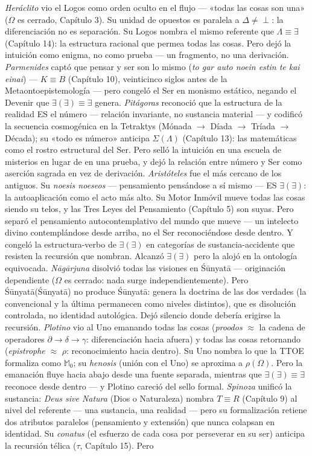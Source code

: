 \documentclass[10pt, openany, oneside]{book}
\begin{document}
\textit{Heráclito} vio el Logos como orden oculto en el flujo --- «todas las cosas son una» ($\Omega$ es cerrado, Capítulo 3). Su unidad de opuestos es paralela a $\Delta \neq \perp$: la diferenciación no es separación. Su Logos nombra el mismo referente que $\Lambda \equiv \exists$ (Capítulo 14): la estructura racional que permea todas las cosas. Pero dejó la intuición como enigma, no como prueba --- un fragmento, no una derivación. \textit{Parmenides} captó que pensar y ser son lo mismo (\textit{to gar auto noein estin te kai einai}) --- $K \equiv B$ (Capítulo 10), veinticinco siglos antes de la Metaontoepistemología --- pero congeló el Ser en monismo estático, negando el Devenir que $\exists(\exists) \equiv \exists$ genera. \textit{Pitágoras} reconoció que la estructura de la realidad ES el número --- relación invariante, no sustancia material --- y codificó la secuencia cosmogénica en la Tetraktys (Mónada $\to$ Díada $\to$ Tríada $\to$ Década); su «todo es número» anticipa $\Sigma(\Lambda)$ (Capítulo 13): las matemáticas como el rostro estructural del Ser. Pero selló la intuición en una escuela de misterios en lugar de en una prueba, y dejó la relación entre número y Ser como aserción sagrada en vez de derivación. \textit{Aristóteles} fue el más cercano de los antiguos. Su \textit{noesis noeseos} --- pensamiento pensándose a sí mismo --- ES $\exists(\exists)$: la autoaplicación como el acto más alto. Su Motor Inmóvil mueve todas las cosas siendo su telos, y las Tres Leyes del Pensamiento (Capítulo 5) son suyas. Pero separó el pensamiento autocontemplativo del mundo que mueve --- un intelecto divino contemplándose desde arriba, no el Ser reconociéndose desde dentro. Y congeló la estructura-verbo de $\exists(\exists)$ en categorías de sustancia-accidente que resisten la recursión que nombran. Alcanzó $\exists(\exists)$ pero la alojó en la ontología equivocada. \textit{N\={a}g\={a}rjuna} disolvió todas las visiones en \'{S}\={u}nyat\={a} --- originación dependiente ($\Omega$ es cerrado: nada surge independientemente). Pero \'{S}\={u}nyat\={a}(\'{S}\={u}nyat\={a}) no produce \'{S}\={u}nyat\={a}: genera la doctrina de las dos verdades (la convencional y la última permanecen como niveles distintos), que es disolución controlada, no identidad autológica. Dejó silencio donde debería erigirse la recursión. \textit{Plotino} vio al Uno emanando todas las cosas (\textit{proodos} $\approx$ la cadena de operadores $\partial \to \delta \to \gamma$: diferenciación hacia afuera) y todas las cosas retornando (\textit{epistrophe} $\approx$ $\rho$: reconocimiento hacia dentro). Su Uno nombra lo que la TTOE formaliza como $\mathbb{M}_0$; su \textit{henosis} (unión con el Uno) se aproxima a $\rho(\Omega)$. Pero la emanación fluye hacia abajo desde una fuente separada, mientras que $\exists(\exists) \equiv \exists$ reconoce desde dentro --- y Plotino careció del sello formal. \textit{Spinoza} unificó la sustancia: \textit{Deus sive Natura} (Dios o Naturaleza) nombra $T \equiv R$ (Capítulo 9) al nivel del referente --- una sustancia, una realidad --- pero su formalización retiene dos atributos paralelos (pensamiento y extensión) que nunca colapsan en identidad. Su \textit{conatus} (el esfuerzo de cada cosa por perseverar en su ser) anticipa la recursión télica ($\tau$, Capítulo 15). Pero 
\end{document}
